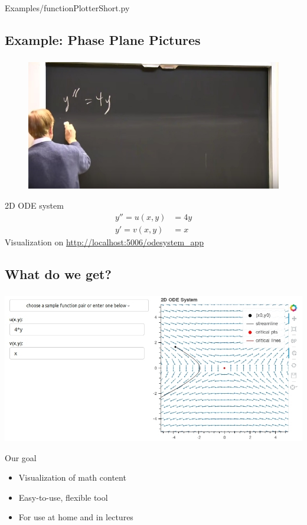 \documentclass[11pt]{beamer}
\newcommand{\cmark}{\ding{51}}%
\newcommand{\citem}{\item[\textcolor{olive}{\cmark}]}
\begin{document}
\begin{frame}

{Examples/functionPlotterShort.py}
\end{frame}

\subsection{Example: Phase Plane Pictures}
\begin{frame}
\frametitle{\insertsubsection}
\begin{figure}
\includegraphics[width=.7\textwidth]{Pictures/Strang1.jpg}
\end{figure}
\pause
\begin{block}{2D ODE system}
\begin{align*}
y'' = u(x,y) & = 4y \\
y' = v(x,y) & = x
\end{align*}
Visualization on \url{http://localhost:5006/odesystem_app}
\end{block}
\end{frame}

\subsection{What do we get?}
\begin{frame}
\frametitle{\insertsubsection}
\begin{center}
\includegraphics[height=.5\textheight]{Pictures/PhasePortraitPlot.jpg}
\end{center}
\begin{block}{Our goal}
\begin{itemize}
\citem Visualization of math content
\citem Easy-to-use, flexible tool
\citem For use at home and in lectures
\end{itemize}
\end{block}

\end{frame}
\end{document}
